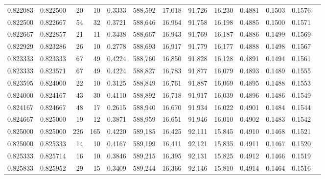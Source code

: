 \begin{tabular}{rrrrrrrrrrrrr}
0.822083 & 0.822500 &    20 &  10 &                                     0.3333 & 588,592 &  17,018 &  91,726 &  16,230 & 0.4881 & 0.1503 & 0.1576 \\
0.822500 & 0.822667 &    54 &  32 &                                     0.3721 & 588,646 &  16,964 &  91,758 &  16,198 & 0.4885 & 0.1500 & 0.1571 \\
0.822667 & 0.822857 &    21 &  11 &                                     0.3438 & 588,667 &  16,943 &  91,769 &  16,187 & 0.4886 & 0.1499 & 0.1569 \\
0.822929 & 0.823286 &    26 &  10 &                                     0.2778 & 588,693 &  16,917 &  91,779 &  16,177 & 0.4888 & 0.1498 & 0.1567 \\
0.823333 & 0.823333 &    67 &  49 &                                     0.4224 & 588,760 &  16,850 &  91,828 &  16,128 & 0.4891 & 0.1494 & 0.1561 \\
0.823333 & 0.823571 &    67 &  49 &                                     0.4224 & 588,827 &  16,783 &  91,877 &  16,079 & 0.4893 & 0.1489 & 0.1555 \\
0.823595 & 0.824000 &    22 &  10 &                                     0.3125 & 588,849 &  16,761 &  91,887 &  16,069 & 0.4895 & 0.1488 & 0.1553 \\
0.824000 & 0.824167 &    43 &  30 &                                     0.4110 & 588,892 &  16,718 &  91,917 &  16,039 & 0.4896 & 0.1486 & 0.1549 \\
0.824167 & 0.824667 &    48 &  17 &                                     0.2615 & 588,940 &  16,670 &  91,934 &  16,022 & 0.4901 & 0.1484 & 0.1544 \\
0.824667 & 0.825000 &    19 &  12 &                                     0.3871 & 588,959 &  16,651 &  91,946 &  16,010 & 0.4902 & 0.1483 & 0.1542 \\
0.825000 & 0.825000 &   226 & 165 &                                     0.4220 & 589,185 &  16,425 &  92,111 &  15,845 & 0.4910 & 0.1468 & 0.1521 \\
0.825000 & 0.825333 &    14 &  10 &                                     0.4167 & 589,199 &  16,411 &  92,121 &  15,835 & 0.4911 & 0.1467 & 0.1520 \\
0.825333 & 0.825714 &    16 &  10 &                                     0.3846 & 589,215 &  16,395 &  92,131 &  15,825 & 0.4912 & 0.1466 & 0.1519 \\
0.825833 & 0.825952 &    29 &  15 &                                     0.3409 & 589,244 &  16,366 &  92,146 &  15,810 & 0.4914 & 0.1464 & 0.1516 \\

\end{tabular}
